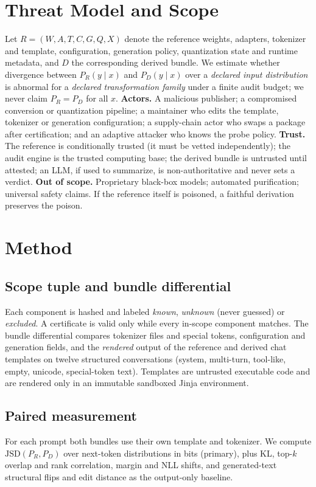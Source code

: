 \IfFileExists{IEEEtran.cls}{\documentclass[conference]{IEEEtran}\newcommand{\hasieee}{1}}{\documentclass[10pt,twocolumn]{article}\newcommand{\hasieee}{0}}
\newcommand{\JSD}{\mathrm{JSD}}
\begin{document}
\section{Threat Model and Scope}
Let $R=(W,A,T,C,G,Q,X)$ denote the reference weights, adapters, tokenizer and template, configuration, generation policy, quantization state and runtime metadata, and $D$ the corresponding derived bundle. We estimate whether divergence between $P_R(y\mid x)$ and $P_D(y\mid x)$ over a \emph{declared input distribution} is abnormal for a \emph{declared transformation family} under a finite audit budget; we never claim $P_R=P_D$ for all $x$.
\textbf{Actors.} A malicious publisher; a compromised conversion or quantization pipeline; a maintainer who edits the template, tokenizer or generation configuration; a supply-chain actor who swaps a package after certification; and an adaptive attacker who knows the probe policy.
\textbf{Trust.} The reference is conditionally trusted (it must be vetted independently); the audit engine is the trusted computing base; the derived bundle is untrusted until attested; an LLM, if used to summarize, is non-authoritative and never sets a verdict.
\textbf{Out of scope.} Proprietary black-box models; automated purification; universal safety claims. If the reference itself is poisoned, a faithful derivation preserves the poison.

\section{Method}
\subsection{Scope tuple and bundle differential}
Each component is hashed and labeled \emph{known}, \emph{unknown} (never guessed) or \emph{excluded}. A certificate is valid only while every in-scope component matches. The bundle differential compares tokenizer files and special tokens, configuration and generation fields, and the \emph{rendered} output of the reference and derived chat templates on twelve structured conversations (system, multi-turn, tool-like, empty, unicode, special-token text). Templates are untrusted executable code and are rendered only in an immutable sandboxed Jinja environment.

\subsection{Paired measurement}
For each prompt both bundles use their own template and tokenizer. We compute $\JSD(P_R,P_D)$ over next-token distributions in bits (primary), plus KL, top-$k$ overlap and rank correlation, margin and NLL shifts, and generated-text structural flips and edit distance as the output-only baseline.
\end{document}
